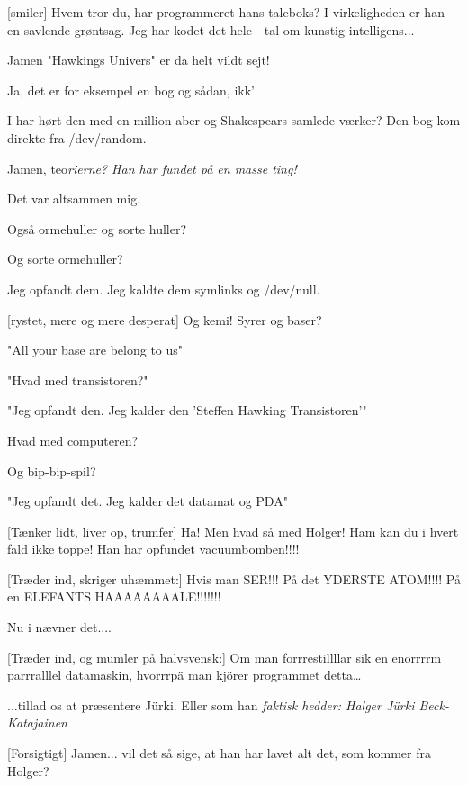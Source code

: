\documentclass[a4paper,11pt]{article}
\begin{document}
\begin{sketch}
   [smiler] Hvem tror du, har programmeret hans taleboks? I
  virkeligheden er han en savlende grøntsag. Jeg har kodet det hele -
  tal om kunstig intelligens...

   Jamen "Hawkings Univers" er da helt vildt sejt!
  
   Ja, det er for eksempel en bog og sådan, ikk'
  
   I har hørt den med en million aber og Shakespears samlede
  værker? Den bog kom direkte fra /dev/random.
  
   Jamen, teo\em{ri}erne? Han har fundet på en masse ting!
  
   Det var altsammen mig.
  
   Også ormehuller og sorte huller?
  
   Og sorte ormehuller?
  
   Jeg opfandt dem. Jeg kaldte dem symlinks og /dev/null.
  
   [rystet, mere og mere desperat] Og kemi! Syrer og baser?
  
   "All your base are belong to us"

   "Hvad med transistoren?"
  
   "Jeg opfandt den. Jeg kalder den 'Steffen Hawking
  Transistoren'"

   Hvad med computeren?

   Og bip-bip-spil?
  
   "Jeg opfandt det. Jeg kalder det datamat og PDA"

  
   [Tænker lidt, liver op, trumfer] Ha! Men hvad så med
  Holger! Ham kan du i hvert fald ikke toppe! Han har opfundet
  vacuumbomben!!!!
  
   [Træder ind, skriger uhæmmet:] Hvis man SER!!! På det
  YDERSTE ATOM!!!! På en ELEFANTS HAAAAAAAALE!!!!!!!

   Nu i nævner det....
  
   [Træder ind, og mumler på halvsvensk:] Om man
  forrrestillllar sik en enorrrrm parrralllel datamaskin, hvorrrpä man
  kjörer programmet detta\ldots
  
   ...tillad os at præsentere Jürki. Eller som han
  \em{faktisk} hedder: Halger Jürki Beck-Katajainen
  
   [Forsigtigt] Jamen... vil det så sige, at han har lavet
  alt det, som kommer fra Holger?
  

\end{sketch}
\end{document}
